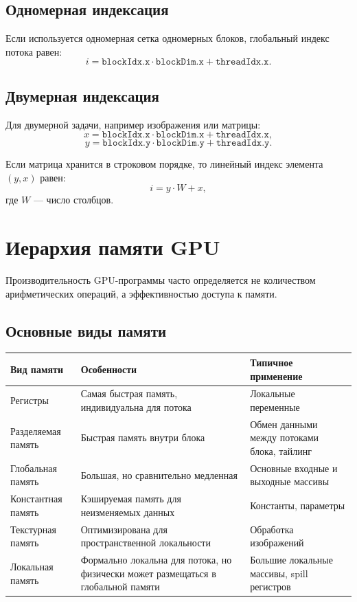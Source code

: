 \documentclass[12pt,a4paper]{article}
\begin{document}
\subsection{Одномерная индексация}

Если используется одномерная сетка одномерных блоков, глобальный индекс потока равен:
\[
    i = \texttt{blockIdx.x} \cdot \texttt{blockDim.x} + \texttt{threadIdx.x}.
\]

\subsection{Двумерная индексация}

Для двумерной задачи, например изображения или матрицы:
\[
    x = \texttt{blockIdx.x} \cdot \texttt{blockDim.x} + \texttt{threadIdx.x},
\]
\[
    y = \texttt{blockIdx.y} \cdot \texttt{blockDim.y} + \texttt{threadIdx.y}.
\]

Если матрица хранится в строковом порядке, то линейный индекс элемента $(y,x)$ равен:
\[
    i = y \cdot W + x,
\]
где $W$ --- число столбцов.

\section{Иерархия памяти GPU}

Производительность GPU-программы часто определяется не количеством арифметических операций, а эффективностью доступа к памяти.

\subsection{Основные виды памяти}

\begin{center}
\begin{tabular}{p{}p{}p{}}
\toprule
\textbf{Вид памяти} & \textbf{Особенности} & \textbf{Типичное применение} \\
\midrule
Регистры & Самая быстрая память, индивидуальна для потока & Локальные переменные \\
Разделяемая память & Быстрая память внутри блока & Обмен данными между потоками блока, тайлинг \\
Глобальная память & Большая, но сравнительно медленная & Основные входные и выходные массивы \\
Константная память & Кэшируемая память для неизменяемых данных & Константы, параметры \\
Текстурная память & Оптимизирована для пространственной локальности & Обработка изображений \\
Локальная память & Формально локальна для потока, но физически может размещаться в глобальной памяти & Большие локальные массивы, spill регистров \\
\bottomrule
\end{tabular}
\end{center}
\end{document}
